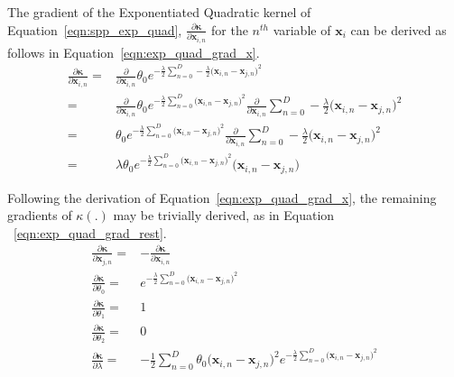 The gradient of the Exponentiated Quadratic kernel of Equation~\ref{eqn:spp_exp_quad},
\( \frac{\partial \bm{\kappa}}{\partial \bm{x}_{i, n}} \) for the \( n^{th} \) variable 
of \( \bm{x}_{i} \) can be derived as follows in Equation~\ref{eqn:exp_quad_grad_x}.
\begin{align}
  \label{eqn:exp_quad_grad_x}
  \frac{\partial \bm{\kappa}}{\partial \bm{x}_{i, n}} ={}& 
  \frac{\partial}{\partial \bm{x}_{i, n}} \theta_{0} e^{-\frac{\lambda}{2} 
  \sum_{n = 0}^{D} -\frac{\lambda}{2} {\big( \bm{x}_{i, n} - \bm{x}_{j, n} \big)}^{2}}\\
  ={}& \frac{\partial}{\partial \bm{x}_{i, n}} \theta_{0} e^{-\frac{\lambda}{2} 
  \sum_{n = 0}^{D} {\big( \bm{x}_{i, n} - \bm{x}_{j, n} \big)}^{2}} 
  \frac{\partial}{\partial \bm{x}_{i, n}} \sum_{n = 0}^{D} -\frac{\lambda}{2} 
  {\big( \bm{x}_{i, n} - \bm{x}_{j, n} \big)}^{2}\\
  ={}& \theta_{0} e^{-\frac{\lambda}{2} 
  \sum_{n = 0}^{D} {\big( \bm{x}_{i, n} - \bm{x}_{j, n} \big)}^{2}} 
  \frac{\partial}{\partial \bm{x}_{i, n}} \sum_{n = 0}^{D} -\frac{\lambda}{2} 
  {\big( \bm{x}_{i, n} - \bm{x}_{j, n} \big)}^{2}\\
  ={}& \lambda \theta_{0} e^{-\frac{\lambda}{2} 
  \sum_{n = 0}^{D} {\big( \bm{x}_{i, n} - \bm{x}_{j, n} \big)}^{2}} 
  {\big( \bm{x}_{i, n} - \bm{x}_{j, n} \big)}
\end{align}

Following the derivation of Equation~\ref{eqn:exp_quad_grad_x}, the remaining 
gradients of \( \kappa(.) \) may be trivially derived, as in Equation
~\ref{eqn:exp_quad_grad_rest}.
\begin{align}
  \label{eqn:exp_quad_grad_rest}
  \frac{\partial \bm{\kappa}}{\partial \bm{x}_{j, n}} ={}& 
  -\frac{\partial \bm{\kappa}}{\partial \bm{x}_{i, n}}\\
  \frac{\partial \bm{\kappa}}{\partial \theta_{0}} ={}&
  e^{-\frac{\lambda}{2} 
  \sum_{n = 0}^{D} {\big( \bm{x}_{i, n} - \bm{x}_{j, n} \big)}^{2}}\\
  \frac{\partial \bm{\kappa}}{\partial \theta_{1}} ={}& 1\\
  \frac{\partial \bm{\kappa}}{\partial \theta_{2}} ={}& 0\\
  \frac{\partial \bm{\kappa}}{\partial \lambda} ={}& 
  -\frac{1}{2} \sum_{n = 0}^{D} \theta_{0} {\big( \bm{x}_{i, n} - \bm{x}_{j, n} \big)}^{2}
  e^{-\frac{\lambda}{2} 
  \sum_{n = 0}^{D} {\big( \bm{x}_{i, n} - \bm{x}_{j, n} \big)}^{2}}
\end{align}

